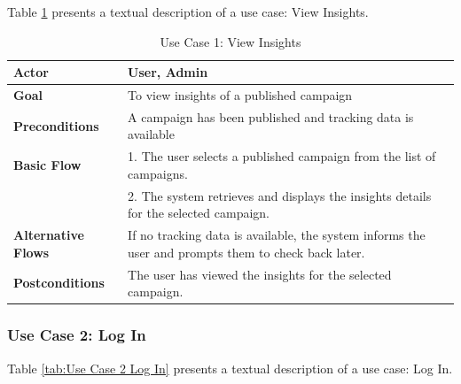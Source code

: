 Table \ref{tab:Use Case 1 View Insights} presents a textual description of a use case: View Insights.

\clearpage

\begin{table}[ht]
	\centering
	\begin{tabularx}{\textwidth}{|l|X|}
		\hline
		\textbf{Actor}             & User, Admin                                                                                         \\
		\hline
		\textbf{Goal}              & To view insights of a published campaign                                                            \\
		\hline
		\textbf{Preconditions}     & A campaign has been published and tracking data is available                                        \\
		\hline
		\textbf{Basic Flow}        & 1. The user selects a published campaign from the list of campaigns.                                \\
		                           & 2. The system retrieves and displays the insights details for the selected campaign.                \\
		\hline
		\textbf{Alternative Flows} & If no tracking data is available, the system informs the user and prompts them to check back later. \\
		\hline
		\textbf{Postconditions}    & The user has viewed the insights for the selected campaign.                                         \\
		\hline
	\end{tabularx}
	\caption{Use Case 1: View Insights}
	\label{tab:Use Case 1 View Insights}
\end{table}

\subsubsection{Use Case 2: Log In}

Table \ref{tab:Use Case 2 Log In} presents a textual description of a use case: Log In.

